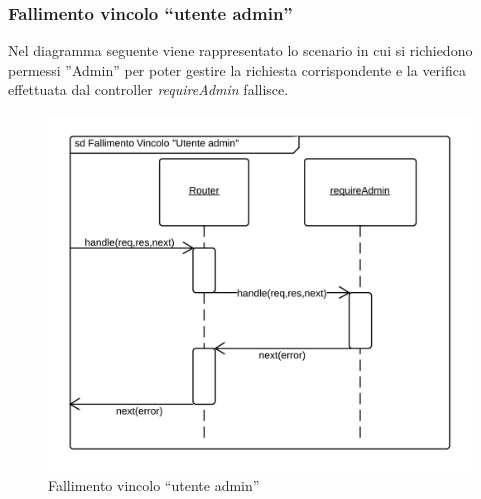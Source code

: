 \subsubsection{Fallimento vincolo ``utente admin''}
Nel diagramma seguente viene rappresentato lo scenario in cui si richiedono permessi ''Admin'' per poter gestire la richiesta corrispondente e la verifica effettuata dal controller \emph{requireAdmin} fallisce. 
\begin{figure}[H]
	\begin{center} 
		\includegraphics[scale=0.20]{scenari/requireAdmin ERROR.png} 
		\caption{Fallimento vincolo ``utente admin''}
	\end{center} 
\end{figure}

\pagebreak
